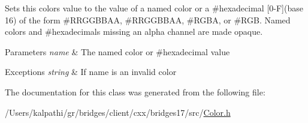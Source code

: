 Sets this color\textquotesingle{}s value to the value of a named color or a \#hexadecimal \mbox{[}0-\/F\mbox{]}(base 16) of the form \#\+R\+R\+G\+G\+B\+B\+AA, \#\+R\+R\+G\+G\+B\+B\+AA, \#\+R\+G\+BA, or \#\+R\+GB. Named colors and \#hexadecimals missing an alpha channel are made opaque.


\begin{DoxyParams}{Parameters}
{\em name} & The named color or \#hexadecimal value \\
\hline
\end{DoxyParams}

\begin{DoxyExceptions}{Exceptions}
{\em string} & If name is an invalid color \\
\hline
\end{DoxyExceptions}


The documentation for this class was generated from the following file\+:\begin{DoxyCompactItemize}
\item 
/\+Users/kalpathi/gr/bridges/client/cxx/bridges17/src/\mbox{\hyperlink{_color_8h}{Color.\+h}}\end{DoxyCompactItemize}
